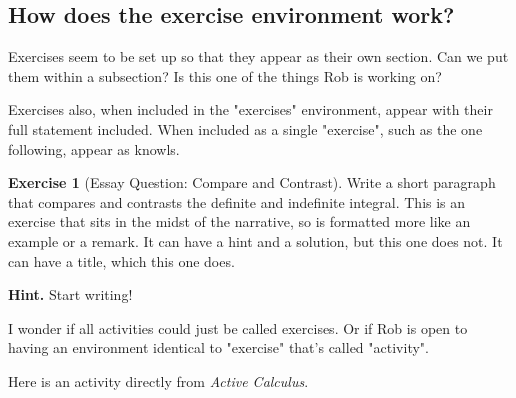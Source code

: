 \documentclass[10pt,]{book}
\theoremstyle{plain}
\theoremstyle{definition}
\theoremstyle{definition}
\theoremstyle{definition}
\newtheorem{exercise}[theorem]{Exercise}
\begin{document}
\subsection[How does the exercise environment work?]{How does the exercise environment work?}\label{subsection-5}
Exercises seem to be set up so that they appear as their own section.  Can we put them within a subsection?  Is this one of the things Rob is working on?%
\par
Exercises also, when included in the "exercises" environment, appear with their full statement included.  When included as a single "exercise", such as the one following, appear as knowls.%
\begin{exercise}[Essay Question: Compare and Contrast]\label{exercise-essay}
Write a short paragraph that compares and contrasts the definite and indefinite integral. This is an exercise that sits in the midst of the narrative, so is formatted more like an example or a remark.  It can have a hint and a solution, but this one does not.  It can have a title, which this one does.%
\par\smallskip
\noindent\textbf{Hint.}\hypertarget{hint-1}{}\quad
Start writing!%
\end{exercise}
\par
I wonder if all activities could just be called exercises.  Or if Rob is open to having an environment identical to "exercise" that's called "activity".%
\par
Here is an activity directly from \emph{Active Calculus}.%
\end{document}
